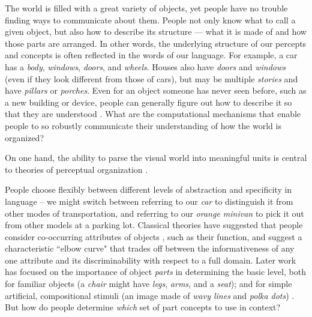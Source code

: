 \documentclass[10pt,letterpaper]{article}
\begin{document}
The world is filled with a great variety of objects, yet people have no trouble finding ways to communicate about them. 
People not only know what to call a given object, but also how to describe its structure --- what it is made of and how those parts are arranged.
In other words, the underlying structure of our percepts and concepts is often reflected in the words of our language.
For example, a car has a \emph{body}, \emph{windows}, \emph{doors}, and \emph{wheels}.
Houses also have \emph{doors} and \emph{windows} (even if they look different from those of cars), but may be multiple \emph{stories} and have \emph{pillars} or \emph{porches}.
Even for an object someone has never seen before, such as a new building or device, people can generally figure out how to describe it so that they are understood \cite{hawkins2020characterizing}. 
What are the computational mechanisms that enable people to so robustly communicate their understanding of how the world is organized?

On one hand, the ability to parse the visual world into meaningful units is central to theories of perceptual organization
\cite{hoffman1984parts,biederman1987recognition,palmer1977hierarchical,tversky1984objects}.
\cite{rosch1976basic}

People choose flexibly between different levels of abstraction and specificity in language -- we might switch between referring to our \textit{car} to distinguish it from other modes of transportation, and referring to our \textit{orange minivan} to pick it out from other models at a parking lot.
Classical theories have suggested that people consider co-occurring attributes of objects , such as their function, and suggest a characteristic ``elbow curve" that trades off between the informativeness of any one attribute and its discriminability with respect to a full domain. Later work has focused on the importance of object \textit{parts} in determining the basic level, both for familiar objects (a \textit{chair} might have \textit{legs}, \textit{arms}, and a \textit{seat}); and for simple artificial, compositional stimuli (an image made of \textit{wavy lines} and \textit{polka dots}) . But how do people determine \textit{which} set of part concepts to use in context?
\end{document}
